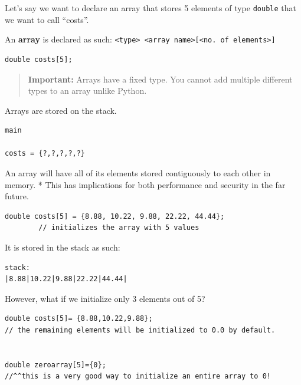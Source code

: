 \documentclass[11pt,a4paper]{article}
\begin{document}
\label{l3-fixed-size-arrays-and-recursion}
\hypertarget{l3-fixed-size-arrays-and-recursion}{}

\label{31-arrays}
\hypertarget{31-arrays}{}

\label{311-array-declaration}
\hypertarget{311-array-declaration}{}

Let's say we want to declare an array that stores 5 elements of type \texttt{double} that we want to call ``costs''.

An \textbf{array} is declared as such: \texttt{\textless{}type\textgreater{}\ \textless{}array\ name\textgreater{}{[}\textless{}no.\ of\ elements\textgreater{}{]}}

\begin{lstlisting}[style=cscode]
double costs[5];
\end{lstlisting}

\begin{quote}
\textbf{Important:} Arrays have a fixed type. You cannot add multiple different types to an array unlike Python.
\end{quote}

Arrays are stored on the stack.

\begin{lstlisting}[style=plaincode]
main

costs = {?,?,?,?,?}
\end{lstlisting}

An array will have all of its elements stored contiguously to each other in memory. * This has implications for both performance and security in the far future.

\begin{lstlisting}[style=cscode]
double costs[5] = {8.88, 10.22, 9.88, 22.22, 44.44};
        // initializes the array with 5 values
\end{lstlisting}

It is stored in the stack as such:

\begin{lstlisting}[style=plaincode]
stack:
|8.88|10.22|9.88|22.22|44.44|
\end{lstlisting}

\label{312-initializing-elements}
\hypertarget{312-initializing-elements}{}

However, what if we initialize only 3 elements out of 5?

\begin{lstlisting}[style=cscode]
double costs[5]= {8.88,10.22,9.88};
// the remaining elements will be initialized to 0.0 by default.


double zeroarray[5]={0};
//^^this is a very good way to initialize an entire array to 0!
\end{lstlisting}
\end{document}
